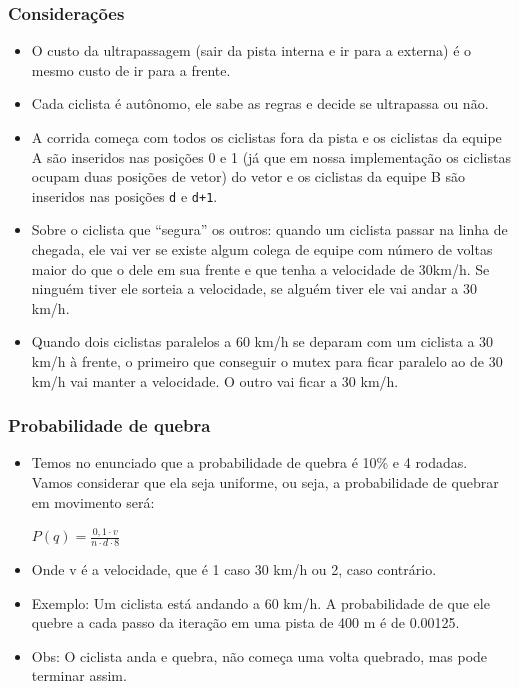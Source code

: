 \documentclass{beamer}
\begin{document}
\begin{frame}
\frametitle{Considerações}
\begin{itemize}
	\item O custo da ultrapassagem (sair da pista interna e ir para a externa) é o mesmo custo de ir para a frente.
	\item Cada ciclista é autônomo, ele sabe as regras e decide se ultrapassa ou não.
	\item A corrida começa com todos os ciclistas fora da pista e os ciclistas da equipe A são inseridos nas posições 0 e 1 (já que em nossa implementação os ciclistas ocupam duas posições de vetor) do vetor e os ciclistas da equipe B são inseridos nas posições \texttt{d} e \texttt{d+1}.
	
\end{itemize}
\end{frame}

\begin{frame}
	\begin{itemize}
		\item Sobre o ciclista que “segura” os outros:  quando um ciclista passar na linha de chegada, ele vai ver se existe algum colega de equipe com número de voltas maior do que o dele em sua frente e que tenha a velocidade de 30km/h.  Se ninguém tiver ele sorteia a velocidade, se alguém tiver ele vai andar a 30 km/h.
		\item Quando dois ciclistas paralelos a 60 km/h se deparam com um ciclista a 30 km/h à frente, o primeiro que conseguir o mutex para ficar paralelo ao de 30 km/h vai manter a velocidade. O outro vai ficar a 30 km/h.
	\end{itemize}
\end{frame}
\begin{frame}
	\frametitle{Probabilidade de quebra}
	\begin{itemize}
		\item Temos no enunciado que a probabilidade de quebra é 10\% e 4 rodadas. 
		Vamos considerar que ela seja uniforme, ou seja, a probabilidade de quebrar em movimento será: \\
		\begin{center} 
			$P(q) = \frac{0,1 \cdot v}{n \cdot d \cdot 8}$
		\end{center}
		\item Onde v é a velocidade, que é 1 caso 30 km/h ou 2, caso contrário.
		\item Exemplo: Um ciclista está andando a 60 km/h. A probabilidade de que ele quebre a cada passo da iteração em uma pista de 400 m é de 0.00125.
		\item Obs: O ciclista anda e quebra, não começa uma volta quebrado, mas pode terminar assim. 
		
	\end{itemize}
\end{frame}
\end{document}
